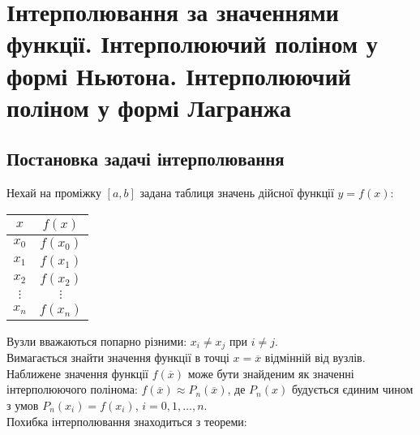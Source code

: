 \section{Інтерполювання за значеннями функції. Інтерполюючий поліном у формі Ньютона. Інтерполюючий поліном у формі Лагранжа}

\subsection{Постановка задачі інтерполювання}

Нехай на проміжку $[a, b]$ задана таблиця значень дійсної функції $y = f(x)$:
\begin{table}[H]
	\centering
	\begin{tabular}{|c|c|}
		\hline
		$x$ & $f(x)$ \\ \hline
		$x_0$ & $f(x_0)$ \\ \hline
		$x_1$ & $f(x_1)$ \\ \hline
		$x_2$ & $f(x_2)$ \\ \hline
		$\vdots$ & $\vdots$ \\ \hline
		$x_n$ & $f(x_n)$ \\ \hline
	\end{tabular}
\end{table}

Вузли вважаються попарно різними: $x_i \ne x_j$ при $i \ne j$. \\

Вимагається знайти значення функції в точці $x = \overline{x}$ відмінній від вузлів. \\

Наближене значення функції $f(\overline{x})$ може бути знайденим як значенні інтерполюючого полінома: $f(\overline{x}) \approx P_n(\overline{x})$, де $P_n(x)$ будується єдиним чином з умов $P_n(x_i) = f(x_i)$, $i= 0,1,\ldots,n$. \\

Похибка інтерполювання знаходиться з теореми:

